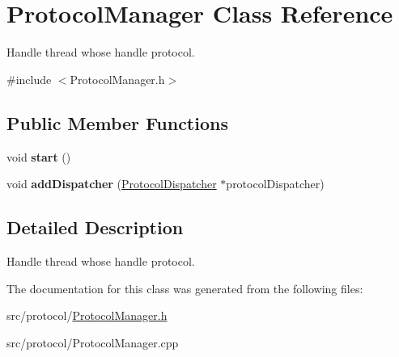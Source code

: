 \hypertarget{class_protocol_manager}{\section{Protocol\-Manager Class Reference}
\label{class_protocol_manager}
}


Handle thread whose handle protocol.  




{\ttfamily \#include $<$Protocol\-Manager.\-h$>$}

\subsection*{Public Member Functions}
\begin{DoxyCompactItemize}
\item 
\hypertarget{class_protocol_manager_a25548b86854128b696cbe69587cc57f7}{void {\bfseries start} ()}\label{class_protocol_manager_a25548b86854128b696cbe69587cc57f7}

\item 
\hypertarget{class_protocol_manager_a437dad6923644870d3fed32a676f2378}{void {\bfseries add\-Dispatcher} (\hyperlink{class_protocol_dispatcher}{Protocol\-Dispatcher} $\ast$protocol\-Dispatcher)}\label{class_protocol_manager_a437dad6923644870d3fed32a676f2378}

\end{DoxyCompactItemize}


\subsection{Detailed Description}
Handle thread whose handle protocol. 

The documentation for this class was generated from the following files\-:\begin{DoxyCompactItemize}
\item 
src/protocol/\hyperlink{_protocol_manager_8h}{Protocol\-Manager.\-h}\item 
src/protocol/Protocol\-Manager.\-cpp\end{DoxyCompactItemize}
